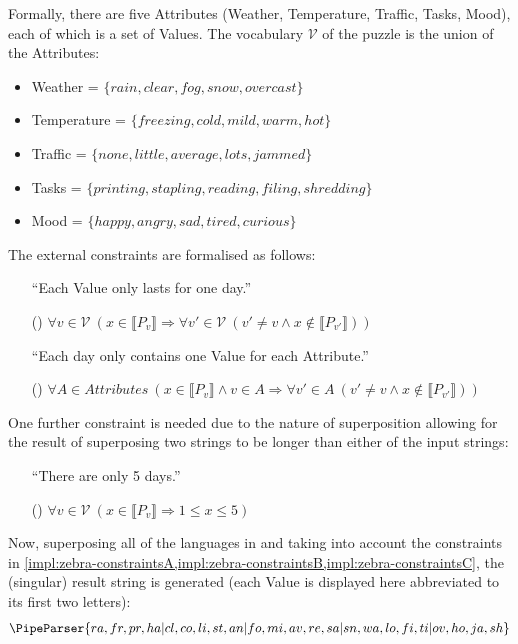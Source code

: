 \documentclass[a4paper,12pt,leqno]{article}
\newcommand{\vph}[1]{\vphantom{#1}}
\newcommand{\ebox}[1]{\fbox{$\vph{'(),}#1$}}
\newcommand{\V}{\mathcal{V}}
\newcommand{\EventString}[1]{%
	\renewcommand*{\do}[1]{\ebox{##1}}%
	\PipeParser{#1}%
}
\newcommand{\ipp}{(\refstepcounter{equation}\theequation)}
\begin{document}
Formally, there are five Attributes (Weather, Temperature, Traffic, Tasks, Mood), each of which is a set of Values. The vocabulary $\V$ of the puzzle is the union of the Attributes:
\begin{itemize}
	\item Weather = $\{rain,clear,fog,snow,overcast\}$
	\item Temperature = $\{freezing,cold,mild,warm,hot\}$
	\item Traffic = $\{none,little,average,lots,jammed\}$
	\item Tasks = $\{printing,stapling,reading,filing,shredding\}$
	\item Mood = $\{happy,angry,sad,tired,curious\}$
\end{itemize}
The external constraints are formalised as follows:
\begin{itemize}
	\item[] ``Each Value only lasts for one day.''
	\item[\ipp\label{impl:zebra-constraintsA}] $\forall v \in \V~ (x \in \llbracket P_v \rrbracket \Longrightarrow \forall v' \in \V~ (v' \neq v \wedge x \notin \llbracket P_{v'} \rrbracket))$
	\item[] ``Each day only contains one Value for each Attribute.''
	\item[\ipp\label{impl:zebra-constraintsB}] $\forall A \in Attributes~ (x \in \llbracket P_v \rrbracket \wedge v \in A \Longrightarrow \forall v' \in A~ (v' \neq v \wedge x \notin \llbracket P_{v'} \rrbracket))$
\end{itemize}
One further constraint is needed due to the nature of superposition allowing for the result of superposing two strings to be longer than either of the input strings:
\begin{itemize}
	\item[]``There are only 5 days.''
	\item[\ipp\label{impl:zebra-constraintsC}] $\forall v \in \V~ (x \in \llbracket P_v \rrbracket \Longrightarrow 1 \leq x \leq 5)$
\end{itemize}
Now, superposing all of the languages in  and taking into account the constraints in \cref{impl:zebra-constraintsA,impl:zebra-constraintsB,impl:zebra-constraintsC}, the (singular) result string is generated (each Value is displayed here abbreviated to its first two letters):
\begin{align}
	\EventString{ra,fr,pr,ha|cl,co,li,st,an|fo,mi,av,re,sa|sn,wa,lo,fi,ti|ov,ho,ja,sh}
\end{align}
\end{document}
